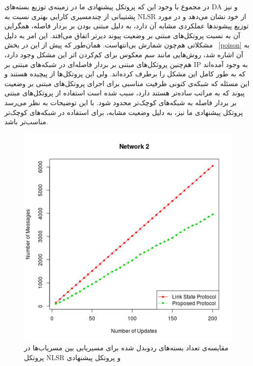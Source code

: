 در مجموع با وجود این که پروتکل پیشنهادی ما در زمینه‌ی توزیع بسته‌های DA و نیز پشتیبانی از چندمسیری کارایی بهتری نسبت به NLSR از خود نشان می‌دهد و در مورد توزیع پیشوندها عملکردی مشابه آن دارد، به دلیل مبتنی بودن بر بردار فاصله، همگرایی آن به نسبت پروتکل‌های مبتنی بر وضعیت پیوند دیرتر اتفاق می‌افتد. این امر به دلیل مشکلاتی هم‌چون شمارش بی‌انتهاست. همان‌طور که پیش از این در بخش ~\ref{poison} به آن اشاره شد، روش‌هایی مانند سم معکوس برای کم‌کردن اثر این مشکل وجود دارد، هم‌چنین پروتکل‌های مبتنی بر بردار فاصله‌ای در شبکه‌های مبتنی بر IP به وجود آمده‌اند که به طور کامل این مشکل را برطرف کرده‌اند. ولی این پروتکل‌ها از پیچیده هستند و این مسئله که شبکه‌ی کنونی ظرفیت مناسبی برای اجرای پروتکل‌های مبتنی بر وضعیت پبوند که به مراتب ساده‌تر هستند دارد، سبب شده است استفاده از پروتکل‌های مبتنی بر بردار فاصله به شبکه‌های کوچک‌تر محدود شود. با این توضیحات به نظر می‌رسد پروتکل پیشنهادی ما نیز، به دلیل وضعیت مشابه، برای استفاده در شبکه‌های کوچک‌تر مناسب‌تر باشد.
\begin{figure}[h!]
\centering
\includegraphics[scale=0.7]{./resources/figures/Test2.png}
\caption{مقایسه‌ی تعداد بسته‌های ردوبدل شده برای مسیریابی بین مسریاب‌ها در پروتکل NLSR و پروتکل پیشنهادی }
\label{fig:Plot2}
\end{figure}


